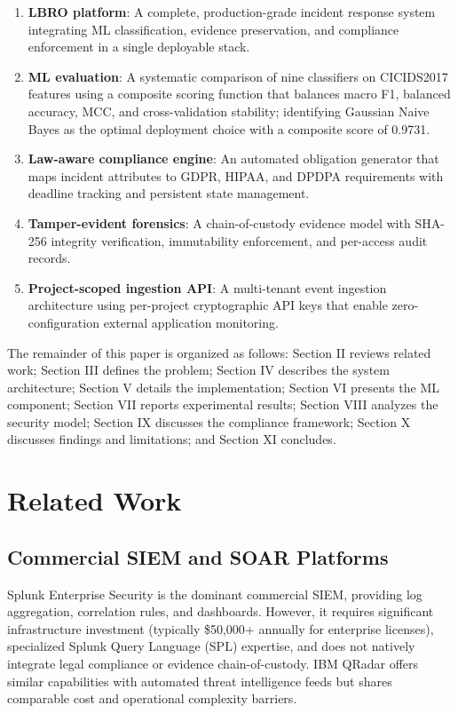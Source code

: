 \documentclass[conference]{IEEEtran}
\begin{document}
\begin{enumerate}
    \item \textbf{LBRO platform}: A complete, production-grade incident response system integrating ML classification, evidence preservation, and compliance enforcement in a single deployable stack.
    \item \textbf{ML evaluation}: A systematic comparison of nine classifiers on CICIDS2017 features using a composite scoring function that balances macro F1, balanced accuracy, MCC, and cross-validation stability; identifying Gaussian Naive Bayes as the optimal deployment choice with a composite score of 0.9731.
    \item \textbf{Law-aware compliance engine}: An automated obligation generator that maps incident attributes to GDPR, HIPAA, and DPDPA requirements with deadline tracking and persistent state management.
    \item \textbf{Tamper-evident forensics}: A chain-of-custody evidence model with SHA-256 integrity verification, immutability enforcement, and per-access audit records.
    \item \textbf{Project-scoped ingestion API}: A multi-tenant event ingestion architecture using per-project cryptographic API keys that enable zero-configuration external application monitoring.
\end{enumerate}

The remainder of this paper is organized as follows: Section II reviews related work; Section III defines the problem; Section IV describes the system architecture; Section V details the implementation; Section VI presents the ML component; Section VII reports experimental results; Section VIII analyzes the security model; Section IX discusses the compliance framework; Section X discusses findings and limitations; and Section XI concludes.

\section{Related Work}

\subsection{Commercial SIEM and SOAR Platforms}

Splunk Enterprise Security \cite{splunk2023} is the dominant commercial SIEM, providing log aggregation, correlation rules, and dashboards. However, it requires significant infrastructure investment (typically \$50,000+ annually for enterprise licenses), specialized Splunk Query Language (SPL) expertise, and does not natively integrate legal compliance or evidence chain-of-custody. IBM QRadar \cite{ibm2023qradar} offers similar capabilities with automated threat intelligence feeds but shares comparable cost and operational complexity barriers.
\end{document}
